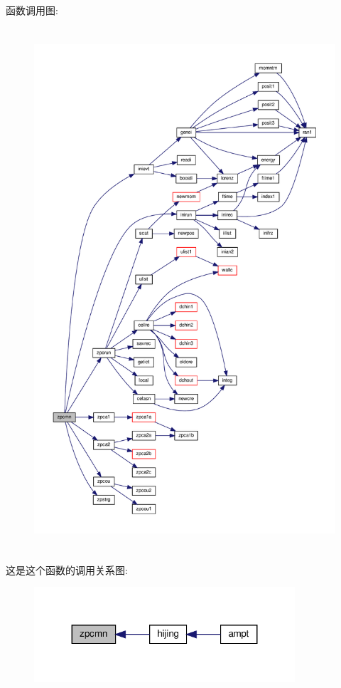 函数调用图\+:
\nopagebreak
\begin{figure}[H]
\begin{center}
\leavevmode
\includegraphics[height=550pt]{zpcmn_8f90_a8e53cb28d6b97d8a476ef72f6da13770_cgraph}
\end{center}
\end{figure}
这是这个函数的调用关系图\+:
\nopagebreak
\begin{figure}[H]
\begin{center}
\leavevmode
\includegraphics[width=275pt]{zpcmn_8f90_a8e53cb28d6b97d8a476ef72f6da13770_icgraph}
\end{center}
\end{figure}
